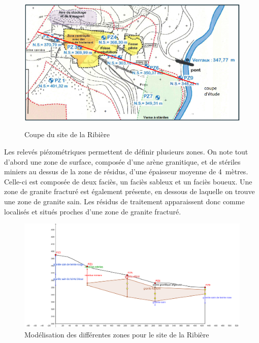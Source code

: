 \documentclass{article}
\begin{document}

\begin{figure}[H]
 \centering
        \includegraphics[width =\textwidth]{III_B_3_2.png} 
        \label{fig:coupe_ribiere}
        \caption{Coupe du site de la Ribière}
\end{figure}
Les relevés piézométriques permettent de définir plusieurs zones. On note tout d’abord une zone de surface, composée d’une arène granitique, et de stériles miniers au dessus de la zone de résidus, d’une épaisseur moyenne de 4~mètres. Celle-ci est composée de deux faciès, un faciès sableux et un faciès boueux. Une zone de granite fracturé est également présente, en dessous de laquelle on trouve une zone de granite sain. Les résidus de traitement apparaissent donc comme localisés et situés proches d’une zone de granite fracturé.

\begin{figure}[H]
    \centering
    \includegraphics[width=0.8\linewidth]{III_B_3_3.png}
    \caption{Modélisation  des différentes zones pour le site de la Ribière}
    \label{fig:zones_ribieres_geogebra}
\end{figure}
\end{document}
